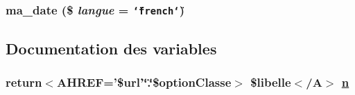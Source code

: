 \hypertarget{utilitaires_2html_8php_a2}{
\subsubsection[ma\_\-date]{\setlength{\rightskip}{0pt plus 5cm}ma\_\-date (\$ {\em langue} = {\tt \char`\"{}french\char`\"{}})}}
\label{utilitaires_2html_8php_a2}




\subsection{Documentation des variables}
\hypertarget{utilitaires_2html_8php_a0}{
\subsubsection[n]{\setlength{\rightskip}{0pt plus 5cm}return$<$AHREF='\$url'\char`\"{}.\char`\"{}\$option\-Classe$>$ \$libelle$<$/A$>$ \hyperlink{utilitaires_2html_8php_a0}{n}}}
\label{utilitaires_2html_8php_a0}


